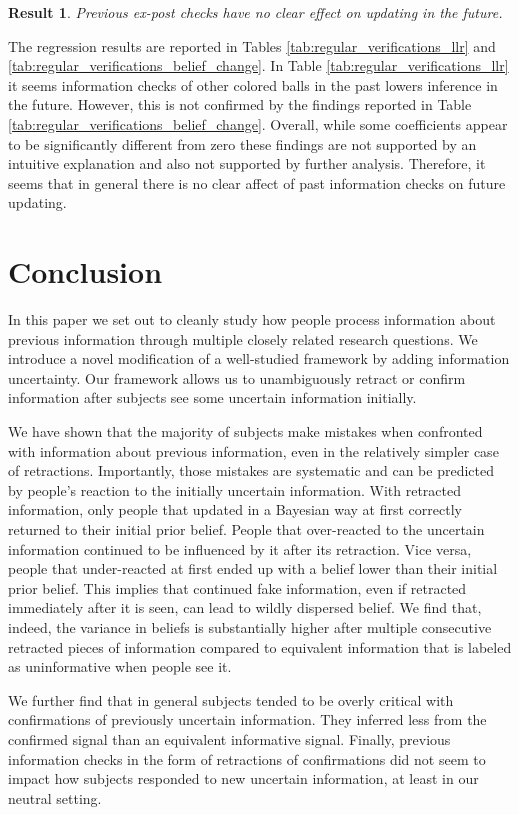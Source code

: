 \documentclass{article}
\newtheorem{result}{Result}
\newenvironment{Result}{\begin{result} \rm }{\end{result}}
\begin{document}
\begin{Result}
Previous ex-post checks have no clear effect on updating in the future.
\end{Result}

The regression results are reported in Tables \ref{tab:regular_verifications_llr} and \ref{tab:regular_verifications_belief_change}. In Table \ref{tab:regular_verifications_llr} it seems information checks of other colored balls in the past lowers inference in the future. However, this is not confirmed by the findings reported in Table \ref{tab:regular_verifications_belief_change}. Overall, while some coefficients appear to be significantly different from zero these findings are not supported by an intuitive explanation and also not supported by further analysis. Therefore, it seems that in general there is no clear affect of past information checks on future updating.


\section{Conclusion}
In this paper we set out to cleanly study how people process information about previous information through multiple closely related research questions. We introduce a novel modification of a well-studied framework by adding information uncertainty. Our framework allows us to unambiguously retract or confirm information after subjects see some uncertain information initially.

We have shown that the majority of subjects make mistakes when confronted with information about previous information, even in the relatively simpler case of retractions. Importantly, those mistakes are systematic and can be predicted by people's reaction to the initially uncertain information. With retracted information, only people that updated in a Bayesian way at first correctly returned to their initial prior belief. People that over-reacted to the uncertain information continued to be influenced by it after its retraction. Vice versa, people that under-reacted at first ended up with a belief lower than their initial prior belief. This implies that continued fake information, even if retracted immediately after it is seen, can lead to wildly dispersed belief. We find that, indeed, the variance in beliefs is substantially higher after multiple consecutive retracted pieces of information compared to equivalent information that is labeled as uninformative when people see it. 

We further find that in general subjects tended to be overly critical with confirmations of previously uncertain information. They inferred less from the confirmed signal than an equivalent informative signal. Finally, previous information checks in the form of retractions of confirmations did not seem to impact how subjects responded to new uncertain information, at least in our neutral setting.
\end{document}
